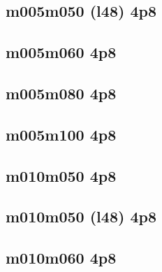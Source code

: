 \documentclass[pdftex,letterpaper,10pt]{article}
\begin{document}


\clearpage \subsection{m005m050 (l48) 4p8}



\clearpage \subsection{m005m060 4p8}



\clearpage \subsection{m005m080 4p8}



\clearpage \subsection{m005m100 4p8}



\clearpage \subsection{m010m050 4p8}



\clearpage \subsection{m010m050 (l48) 4p8}



\clearpage \subsection{m010m060 4p8}
\end{document}
